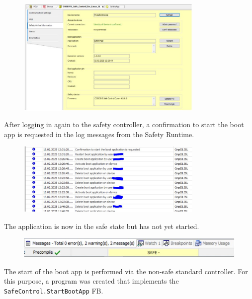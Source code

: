 \documentclass[a4paper,12pt]{article}
\begin{document}
\begin{figure}[H]
	\centering
	\includegraphics[width=0.8\textwidth]{e21.JPG}
\end{figure}
After logging in again to the safety controller, a confirmation to start the boot app is requested in the log messages from the Safety Runtime.
\begin{figure}[H]
	\centering
	\includegraphics[width=0.8\textwidth]{e22.JPG}
\end{figure}
The application is now in the safe state but has not yet started.
\begin{figure}[H]
	\centering
	\includegraphics[width=1\textwidth]{e23.JPG}
\end{figure}
The start of the boot app is performed via the non-safe standard controller. For this purpose, a program was created that implements the \texttt{SafeControl.StartBootApp} FB.
\end{document}
